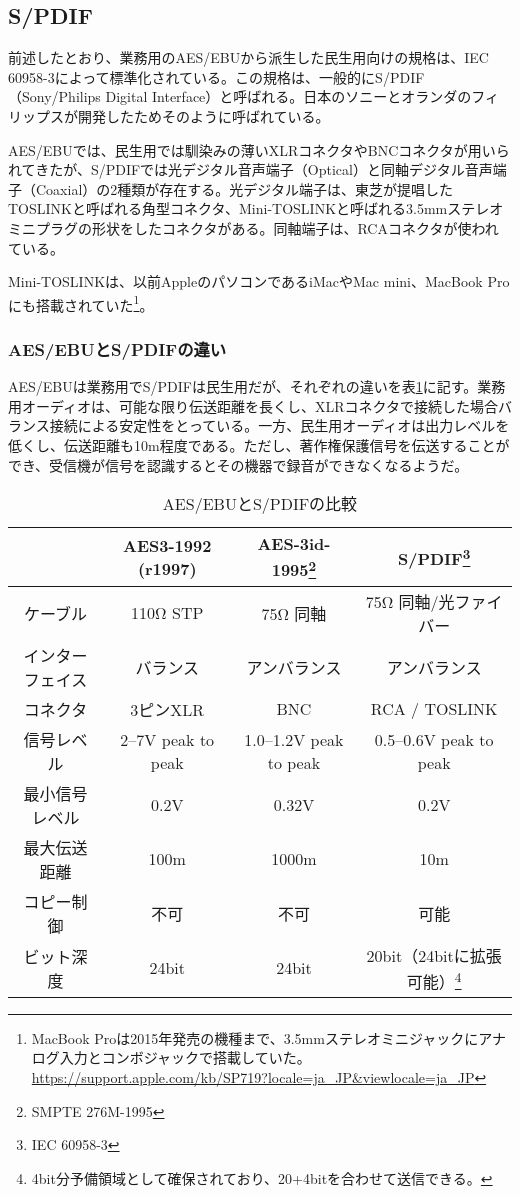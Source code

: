 \subsection{S/PDIF}

前述したとおり、業務用のAES/EBUから派生した民生用向けの規格は、IEC 60958-3によって標準化されている。この規格は、一般的にS/PDIF（Sony/Philips Digital Interface）と呼ばれる。日本のソニーとオランダのフィリップスが開発したためそのように呼ばれている。

AES/EBUでは、民生用では馴染みの薄いXLRコネクタやBNCコネクタが用いられてきたが、S/PDIFでは光デジタル音声端子（Optical）と同軸デジタル音声端子（Coaxial）の2種類が存在する。光デジタル端子は、東芝が提唱したTOSLINKと呼ばれる角型コネクタ、Mini-TOSLINKと呼ばれる3.5mmステレオミニプラグの形状をしたコネクタがある。同軸端子は、RCAコネクタが使われている。

Mini-TOSLINKは、以前AppleのパソコンであるiMacやMac mini、MacBook Proにも搭載されていた\footnote{MacBook Proは2015年発売の機種まで、3.5mmステレオミニジャックにアナログ入力とコンボジャックで搭載していた。 \url{https://support.apple.com/kb/SP719?locale=ja_JP&viewlocale=ja_JP}}。

\subsubsection{AES/EBUとS/PDIFの違い}

AES/EBUは業務用でS/PDIFは民生用だが、それぞれの違いを表\ref{tab:compare}に記す\cite{aesebuandspdif}。業務用オーディオは、可能な限り伝送距離を長くし、XLRコネクタで接続した場合バランス接続による安定性をとっている。一方、民生用オーディオは出力レベルを低くし、伝送距離も10m程度である。ただし、著作権保護信号を伝送することができ、受信機が信号を認識するとその機器で録音ができなくなるようだ。

\begin{table}[htb]
  \begin{minipage}{\textwidth}
    \small
    \caption{AES/EBUとS/PDIFの比較}
    \label{tab:compare}
    \begin{tabular}{c|ccc} \hline
      & AES3-1992 (r1997) & AES-3id-1995\footnote{SMPTE 276M-1995} & S/PDIF\footnote{IEC 60958-3} \\ \hline
      ケーブル & 110Ω STP & 75Ω 同軸 & 75Ω 同軸/光ファイバー \\
      インターフェイス & バランス & アンバランス & アンバランス \\
      コネクタ & 3ピンXLR & BNC & RCA / TOSLINK \\
      信号レベル & 2--7V peak to peak & 1.0--1.2V peak to peak & 0.5--0.6V peak to peak \\
      最小信号レベル & 0.2V & 0.32V & 0.2V \\
      最大伝送距離 & 100m & 1000m & 10m \\
      コピー制御 & 不可 & 不可 & 可能 \\
      ビット深度 & 24bit & 24bit & 20bit（24bitに拡張可能）\footnote{4bit分予備領域として確保されており、20+4bitを合わせて送信できる。} \\
    \end{tabular}
  \end{minipage}
\end{table}

